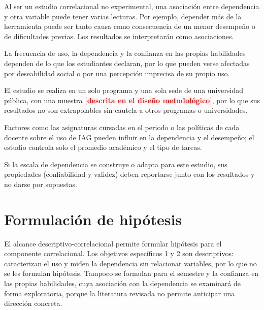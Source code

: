 \documentclass[12pt,a4paper,oneside]{report}
\newcommand{\pendiente}[1]{\textcolor{red}{\textbf{[#1]}}}
\begin{document}
\begin{description}[style=nextline,leftmargin=1.5em]
  \item[No permite establecer causalidad.] Al ser un estudio correlacional no experimental, una asociación entre dependencia y otra variable puede tener varias lecturas. Por ejemplo, depender más de la herramienta puede ser tanto causa como consecuencia de un menor desempeño o de dificultades previas. Los resultados se interpretarán como asociaciones.

  \item[Datos de autorreporte.] La frecuencia de uso, la dependencia y la confianza en las propias habilidades dependen de lo que los estudiantes declaran, por lo que pueden verse afectadas por deseabilidad social o por una percepción imprecisa de su propio uso.

  \item[Generalización limitada.] El estudio se realiza en un solo programa y una sola sede de una universidad pública, con una muestra \pendiente{descrita en el diseño metodológico}, por lo que sus resultados no son extrapolables sin cautela a otros programas o universidades.

  \item[Variables externas no controladas del todo.] Factores como las asignaturas cursadas en el periodo o las políticas de cada docente sobre el uso de IAG pueden influir en la dependencia y el desempeño; el estudio controla solo el promedio académico y el tipo de tareas.

  \item[Validación del instrumento dentro del mismo estudio.] Si la escala de dependencia se construye o adapta para este estudio, sus propiedades (confiabilidad y validez) deben reportarse junto con los resultados y no darse por supuestas.
\end{description}

\chapter{Formulación de hipótesis}

El alcance descriptivo-correlacional permite formular hipótesis para el componente correlacional. Los objetivos específicos 1 y 2 son descriptivos: caracterizan el uso y miden la dependencia sin relacionar variables, por lo que no se les formulan hipótesis. Tampoco se formulan para el semestre y la confianza en las propias habilidades, cuya asociación con la dependencia se examinará de forma exploratoria, porque la literatura revisada no permite anticipar una dirección concreta.
\end{document}
